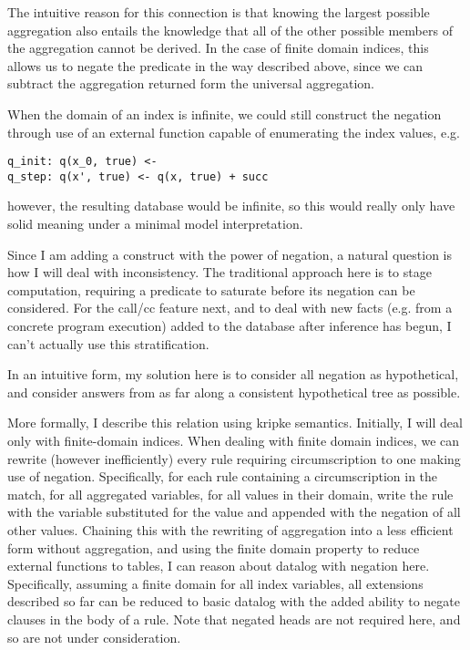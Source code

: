 The intuitive reason for this connection is that knowing the largest possible aggregation also entails the knowledge that all of the other possible members of the aggregation cannot be derived.
In the case of finite domain indices, this allows us to negate the predicate in the way described above, since we can subtract the aggregation returned form the universal aggregation.

When the domain of an index is infinite, we could still construct the negation through use of an external function capable of enumerating the index values, e.g.
\begin{verbatim}
q_init: q(x_0, true) <-
q_step: q(x', true) <- q(x, true) + succ
\end{verbatim}
however, the resulting database would be infinite, so this would really only have solid meaning under a minimal model interpretation.

Since I am adding a construct with the power of negation, a natural question is how I will deal with inconsistency.
The traditional approach here is to stage computation, requiring a predicate to saturate before its negation can be considered.
For the call/cc feature next, and to deal with new facts (e.g. from a concrete program execution) added to the database after inference has begun, I can't actually use this stratification.

In an intuitive form, my solution here is to consider all negation as hypothetical, and consider answers from as far along a consistent hypothetical tree as possible.

More formally, I describe this relation using kripke semantics.
Initially, I will deal only with finite-domain indices.
When dealing with finite domain indices, we can rewrite (however inefficiently) every rule requiring circumscription to one making use of negation.
Specifically, for each rule containing a circumscription in the match, for all aggregated variables, for all values in their domain, write the rule with the variable substituted for the value and appended with the negation of all other values.
Chaining this with the rewriting of aggregation into a less efficient form without aggregation, and using the finite domain property to reduce external functions to tables, I can reason about datalog with negation here.
Specifically, assuming a finite domain for all index variables, all extensions described so far can be reduced to basic datalog with the added ability to negate clauses in the body of a rule.
Note that negated heads are not required here, and so are not under consideration.

